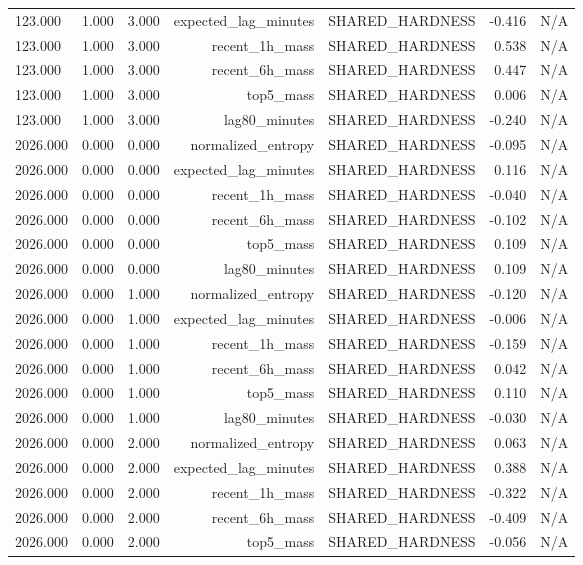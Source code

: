 \begin{table}[h!]
\begin{tabular}{lrrrrrr}
123.000 & 1.000 & 3.000 & expected\_lag\_minutes & SHARED\_HARDNESS & -0.416 & N/A \\
123.000 & 1.000 & 3.000 & recent\_1h\_mass & SHARED\_HARDNESS & 0.538 & N/A \\
123.000 & 1.000 & 3.000 & recent\_6h\_mass & SHARED\_HARDNESS & 0.447 & N/A \\
123.000 & 1.000 & 3.000 & top5\_mass & SHARED\_HARDNESS & 0.006 & N/A \\
123.000 & 1.000 & 3.000 & lag80\_minutes & SHARED\_HARDNESS & -0.240 & N/A \\
2026.000 & 0.000 & 0.000 & normalized\_entropy & SHARED\_HARDNESS & -0.095 & N/A \\
2026.000 & 0.000 & 0.000 & expected\_lag\_minutes & SHARED\_HARDNESS & 0.116 & N/A \\
2026.000 & 0.000 & 0.000 & recent\_1h\_mass & SHARED\_HARDNESS & -0.040 & N/A \\
2026.000 & 0.000 & 0.000 & recent\_6h\_mass & SHARED\_HARDNESS & -0.102 & N/A \\
2026.000 & 0.000 & 0.000 & top5\_mass & SHARED\_HARDNESS & 0.109 & N/A \\
2026.000 & 0.000 & 0.000 & lag80\_minutes & SHARED\_HARDNESS & 0.109 & N/A \\
2026.000 & 0.000 & 1.000 & normalized\_entropy & SHARED\_HARDNESS & -0.120 & N/A \\
2026.000 & 0.000 & 1.000 & expected\_lag\_minutes & SHARED\_HARDNESS & -0.006 & N/A \\
2026.000 & 0.000 & 1.000 & recent\_1h\_mass & SHARED\_HARDNESS & -0.159 & N/A \\
2026.000 & 0.000 & 1.000 & recent\_6h\_mass & SHARED\_HARDNESS & 0.042 & N/A \\
2026.000 & 0.000 & 1.000 & top5\_mass & SHARED\_HARDNESS & 0.110 & N/A \\
2026.000 & 0.000 & 1.000 & lag80\_minutes & SHARED\_HARDNESS & -0.030 & N/A \\
2026.000 & 0.000 & 2.000 & normalized\_entropy & SHARED\_HARDNESS & 0.063 & N/A \\
2026.000 & 0.000 & 2.000 & expected\_lag\_minutes & SHARED\_HARDNESS & 0.388 & N/A \\
2026.000 & 0.000 & 2.000 & recent\_1h\_mass & SHARED\_HARDNESS & -0.322 & N/A \\
2026.000 & 0.000 & 2.000 & recent\_6h\_mass & SHARED\_HARDNESS & -0.409 & N/A \\
2026.000 & 0.000 & 2.000 & top5\_mass & SHARED\_HARDNESS & -0.056 & N/A \\

\end{tabular}
\end{table}
